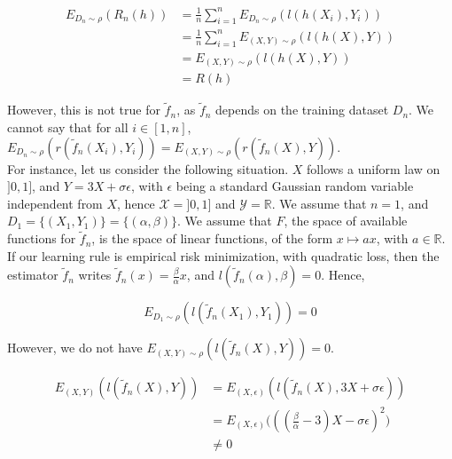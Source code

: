 \documentclass[
10pt, %
a4paper, %
oneside, %
headinclude,footinclude, %
BCOR5mm, %
]{scrartcl}
\begin{document}
    \begin{equation*}
	    \begin{aligned}
		E_{D_n\sim \rho}(R_n(h)) &= \frac{1}{n} \sum^{n}_{i=1} E_{D_n\sim \rho}(l(h(X_i), Y_i)) \\
		&= \frac{1}{n} \sum^{n}_{i=1} E_{(X,Y)\sim \rho}(l(h(X), Y)) \\
		&=  E_{(X,Y)\sim \rho}(l(h(X), Y)) \\
		&= R(h)
	    \end{aligned}
    \end{equation*}

    However, this is not true for $ \tilde{f}_n$, as $ \tilde{f}_n$ depends on the training dataset $ D_n$. We cannot say that for all $i\in [1, n]$, $E_{D_n\sim \rho}(r( \tilde{f}_n(X_i), Y_i)) = E_{(X,Y)\sim\rho}(r( \tilde{f}_n(X), Y))$.
    \\

    For instance, let us consider the following situation. $X$ follows a uniform law on $]0, 1]$, and $Y=3X+\sigma\epsilon$, with $\epsilon$ being a standard Gaussian random variable independent from $X$, hence $ \mathcal{X} = ]0, 1]$ and $ \mathcal{Y} = \mathbb{R} $. We assume that $n=1$, and $D_1 = \{(X_1, Y_1)\}=\{(\alpha, \beta)\}$. We assume that $F$, the space of available functions for $ \tilde{f}_n$, is the space of linear functions, of the form $ x\mapsto ax$, with $a\in \mathbb{R}$. If our learning rule is empirical risk minimization, with quadratic loss, then the estimator $ \tilde{f}_n$ writes $ \tilde{f}_n(x)= \frac{\beta}{\alpha}x$, and $l( \tilde{f}_n(\alpha), \beta)=0$. Hence,

    \begin{equation}
	E_{D_1\sim \rho}(l( \tilde{f}_n(X_1), Y_1))=0
    \end{equation}

    However, we do not have $E_{(X,Y)\sim \rho}(l( \tilde{f}_n(X), Y))=0$.

    \begin{equation*}
        \begin{aligned}
            \label{eq:}
	    E_{(X,Y)}(l( \tilde{f}_n(X), Y))&=E_{(X,\epsilon)}(l( \tilde{f}_n(X), 3X+\sigma\epsilon))\\
            &=E_{(X,\epsilon)}\big(( (\frac{\beta}{\alpha} - 3)X-\sigma\epsilon)^2\big)\\
            &\neq 0
        \end{aligned}
    \end{equation*}
\end{document}
